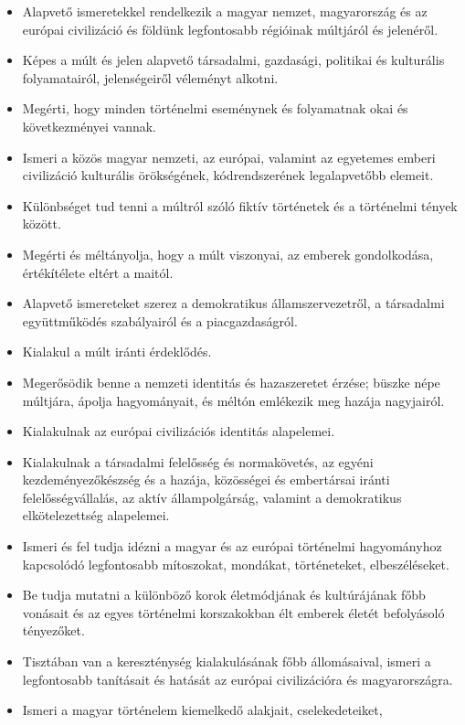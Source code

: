 \begin{itemize}
\item
  Alapvető ismeretekkel rendelkezik a magyar nemzet, magyarország és az
  európai civilizáció és földünk legfontosabb régióinak múltjáról és
  jelenéről.
\item
  Képes a múlt és jelen alapvető társadalmi, gazdasági, politikai és
  kulturális folyamatairól, jelenségeiről véleményt alkotni.
\item
  Megérti, hogy minden történelmi eseménynek és folyamatnak okai és
  következményei vannak.
\item
  Ismeri a közös magyar nemzeti, az európai, valamint az egyetemes
  emberi civilizáció kulturális örökségének, kódrendszerének
  legalapvetőbb elemeit.
\item
  Különbséget tud tenni a múltról szóló fiktív történetek és a
  történelmi tények között.
\item
  Megérti és méltányolja, hogy a múlt viszonyai, az emberek
  gondolkodása, értékítélete eltért a maitól.
\item
  Alapvető ismereteket szerez a demokratikus államszervezetről, a
  társadalmi együttműködés szabályairól és a piacgazdaságról.
\item
  Kialakul a múlt iránti érdeklődés.
\item
  Megerősödik benne a nemzeti identitás és hazaszeretet érzése; büszke
  népe múltjára, ápolja hagyományait, és méltón emlékezik meg hazája
  nagyjairól.
\item
  Kialakulnak az európai civilizációs identitás alapelemei.
\item
  Kialakulnak a társadalmi felelősség és normakövetés, az egyéni
  kezdeményezőkészség és a hazája, közösségei és embertársai iránti
  felelősségvállalás, az aktív állampolgárság, valamint a demokratikus
  elkötelezettség alapelemei.
\item
  Ismeri és fel tudja idézni a magyar és az európai történelmi
  hagyományhoz kapcsolódó legfontosabb mítoszokat, mondákat,
  történeteket, elbeszéléseket.
\item
  Be tudja mutatni a különböző korok életmódjának és kultúrájának főbb
  vonásait és az egyes történelmi korszakokban élt emberek életét
  befolyásoló tényezőket.
\item
  Tisztában van a kereszténység kialakulásának főbb állomásaival, ismeri
  a legfontosabb tanításait és hatását az európai civilizációra és
  magyarországra.
\item
  Ismeri a magyar történelem kiemelkedő alakjait, cselekedeteiket,

\end{itemize}
